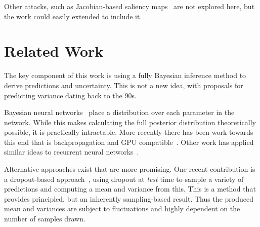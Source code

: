 \documentclass{article}
\begin{document}
Other attacks, such as Jacobian-based saliency maps~\cite{papernot2016limitations} are not explored here, but the work could easily extended to include it.


  
 



\section{Related Work}


The key component of this work is using a fully Bayesian inference method to derive predictions and uncertainty. This is not a new idea, with proposals for predicting variance dating back to the 90s.

Bayesian neural networks~\cite{mackay1992practical} place a distribution over each parameter in the network. While this makes calculating the full posterior distribution theoretically possible, it is practically intractable. More recently there has been work towards this end that is backpropagation and GPU compatible~\cite{blundell2015weight}. Other work has applied similar ideas to recurrent neural networks~\cite{zhu2017deep}.

Alternative approaches exist that are more promising. One recent contribution is a dropout-based approach~\cite{gal2016dropout}, using dropout at \textit{test} time to sample a variety of predictions and computing a mean and variance from this. This is a  method that provides principled, but an inherently sampling-based result. Thus the produced mean and variances are subject to fluctuations and highly dependent on the number of samples drawn.
\end{document}
